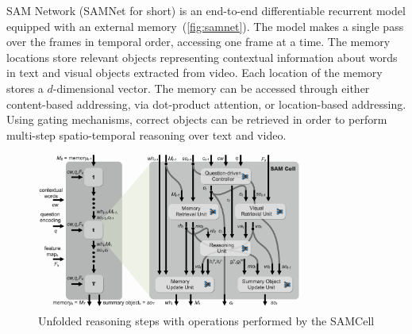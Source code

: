 
SAM Network (SAMNet for short) is an end-to-end differentiable recurrent model equipped with an external memory~(\cref{fig:samnet}).
The model makes a single pass over the frames in temporal order, accessing one frame at a time.
The memory locations store relevant objects representing contextual information about words in text and visual objects extracted from video. 
Each location of the memory stores a $d$-dimensional vector. %
The memory can be accessed through either content-based addressing, via dot-product attention, or location-based addressing. 
Using gating mechanisms, correct objects can be retrieved 
in order to perform multi-step spatio-temporal reasoning over text and video.  


\begin{figure}
	\centering
	\includegraphics[width=0.78\textwidth]{../img/architecture/samcell_reasoning}
	\caption{Unfolded reasoning steps with operations performed by the SAMCell}
	\label{fig:samcell}
\end{figure}


